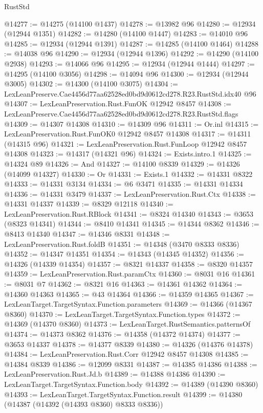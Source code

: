 \begin{lexlean}{RustStd}
\begin{coremodule}
@14277 := @14275 (@14100 @1437)
@14278 := @13982 @96
@14280 := @12934 (@12944 @1351)
@14282 := @14280 (@14100 @1447)
@14283 := @14010 @96
@14285 := @12934 (@12944 @1391)
@14287 := @14285 (@14100 @1464)
@14288 := @14038 @96
@14290 := @12934 (@12944 @1396)
@14292 := @14290 (@14100 @2938)
@14293 := @14066 @96
@14295 := @12934 (@12944 @1444)
@14297 := @14295 (@14100 @3056)
@14298 := @14094 @96
@14300 := @12934 (@12944 @3005)
@14302 := @14300 (@14100 @3075)
@14304 := LexLeanPreserve.Cae4456d77aa62528ed0bd9d0612cd278.R23.RustStd.idx40 @96
@14307 := LexLeanPreservation.Rust.FunOK @12942 @8457
@14308 := LexLeanPreserve.Cae4456d77aa62528ed0bd9d0612cd278.R23.RustStd.flags
@14309 := @14307 @14308
@14310 := @14309 @96
@14311 := Or.inl
@14315 := LexLeanPreservation.Rust.FunOK0 @12942 @8457 @14308
@14317 := @14311 (@14315 @96)
@14321 := LexLeanPreservation.Rust.FunLoop @12942 @8457 @14308
@14323 := @14317 (@14321 @96)
@14324 := Exists.intro.{1}
@14325 := @14324 @89
@14326 := And
@14327 := @14100 @8339
@14329 := @14326 (@14099 @14327)
@14330 := Or
@14331 := Exists.{1}
@14332 := @14331 @8322
@14333 := @14331 @3134
@14334 := @6 @3471
@14335 := @14331 @14334
@14336 := @14331 @3479
@14337 := LexLeanPreservation.Rust.Ctx
@14338 := @14331 @14337
@14339 := @8329 @12118
@14340 := LexLeanPreservation.Rust.RBlock
@14341 := @8324 @14340
@14343 := @3653 (@8323 @14341)
@14344 := @8410 @14341
@14345 := @14344 @8362
@14346 := @8413 @14340
@14347 := @14346 @8331
@14348 := LexLeanPreservation.Rust.foldB
@14351 := @14348 (@3470 @8333 @8336)
@14352 := @14347 @14351
@14354 := @14343 (@14345 @14352)
@14356 := @14326 (@14339 @14354)
@14357 := @8321 @14337
@14358 := @8320 @14357
@14359 := LexLeanPreservation.Rust.paramCtx
@14360 := @8031 @16
@14361 := @8031 @7
@14362 := @8321 @16
@14363 := @14361 @14362
@14364 := @14360 @14363
@14365 := @43 @14364
@14366 := @14359 @14365
@14367 := LexLeanTarget.TargetSyntax.Function.parameters
@14369 := @14366 (@14367 @8360)
@14370 := LexLeanTarget.TargetSyntax.Function.types
@14372 := @14369 (@14370 @8360)
@14373 := LexLeanTarget.RustSemantics.patternsOf
@14374 := @14373 @8362
@14376 := @14358 (@14372 @14374)
@14377 := @3653 @14337
@14378 := @14377 @8339
@14380 := @14326 (@14376 @14378)
@14384 := LexLeanPreservation.Rust.Corr @12942 @8457 @14308
@14385 := @14384 @8339
@14386 := @12099 @8331
@14387 := @14385 @14386
@14388 := LexLeanPreservation.Rust.Jd.b
@14389 := @14388 @14386
@14390 := LexLeanTarget.TargetSyntax.Function.body
@14392 := @14389 (@14390 @8360)
@14393 := LexLeanTarget.TargetSyntax.Function.result
@14399 := @14380 (@14387 (@14392 (@14393 @8360) @8333 @8336))

\end{coremodule}
\end{lexlean}
